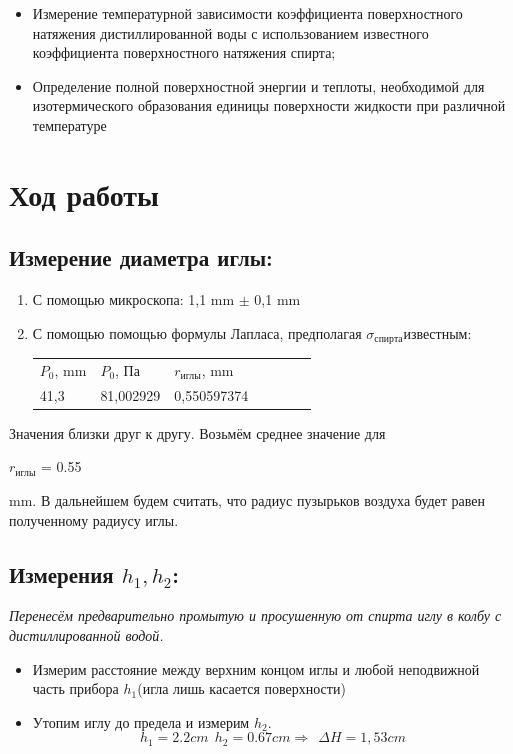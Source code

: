 \documentclass[a4paper,12pt]{article}
\theoremstyle{plain} %
\theoremstyle{definition} %
\theoremstyle{remark} %
\begin{document}
\begin{itemize}
\item Измерение температурной зависимости  коэффициента поверхностного натяжения дистиллированной воды с использованием известного коэффициента поверхностного натяжения спирта; 
\item Определение полной поверхностной энергии  и теплоты, необходимой для изотермического образования единицы  поверхности жидкости  при различной температуре

\end{itemize}

	
\newpage
\section{Ход работы} \label{sec:MainWorks}

\subsection{Измерение диаметра иглы:}
\begin{enumerate}
\item С помощью микроскопа:
\large{1,1 mm $\pm$ 0,1 mm}
\item С помощью помощью формулы Лапласа, предполагая $\sigma_\text{спирта} известным:$

\begin{tabular}{lllllll}
\cline{1-3}
\multicolumn{1}{|l|}{$P_0$, mm} & \multicolumn{1}{l|}{$P_0$, Па}  & \multicolumn{1}{l|}{$r_\text{иглы}$, mm}  &  &  &  &  \\ \cline{1-3}
\multicolumn{1}{|l|}{41,3}     & \multicolumn{1}{l|}{81,002929} & \multicolumn{1}{l|}{0,550597374} &  &  &  &  \\ \cline{1-3}
\end{tabular}
\end{enumerate}
Значения близки друг к другу. Возьмём среднее значение для \begin{Large}
$r_\text{иглы}$ = 0.55
\end{Large} 
mm. В дальнейшем будем считать, что радиус пузырьков воздуха будет равен полученному радиусу иглы.

\subsection{Измерения $h_1, h_2$:}
\begin{flushleft}
\textit{Перенесём предварительно промытую и 
просушенную от спирта иглу
в колбу с дистиллированной водой.} \\[1ex]
\end{flushleft}
\begin{itemize}
\item Измерим расстояние между верхним концом иглы и любой неподвижной часть прибора $h_1$(игла лишь касается поверхности)
\item Утопим иглу до предела и измерим $h_2$.
\[h_1 = 2.2 cm \ \ h_2 = 0.67 cm \Rightarrow \ \ \Delta H =1,53 cm\]
\end{itemize}
\end{document}
